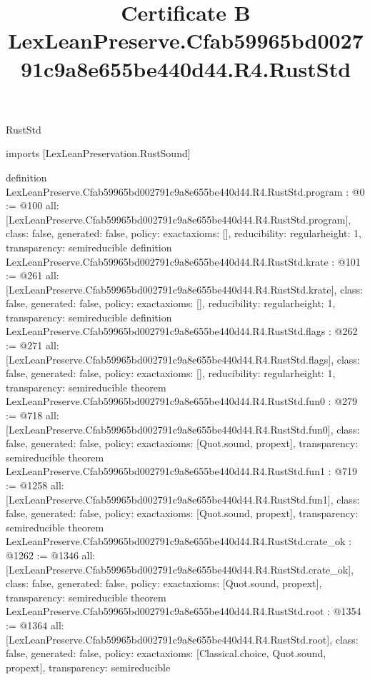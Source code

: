 \begin{lexlean}{RustStd}
\title{Certificate B LexLeanPreserve.Cfab59965bd002791c9a8e655be440d44.R4.RustStd}
\begin{coremodule}
imports [LexLeanPreservation.RustSound]

definition LexLeanPreserve.Cfab59965bd002791c9a8e655be440d44.R4.RustStd.program : @0 := @100 {
  all: [LexLeanPreserve.Cfab59965bd002791c9a8e655be440d44.R4.RustStd.program],
  class: false,
  generated: false,
  policy: exact{axioms: []},
  reducibility: regular{height: 1},
  transparency: semireducible
}
definition LexLeanPreserve.Cfab59965bd002791c9a8e655be440d44.R4.RustStd.krate : @101 := @261 {
  all: [LexLeanPreserve.Cfab59965bd002791c9a8e655be440d44.R4.RustStd.krate],
  class: false,
  generated: false,
  policy: exact{axioms: []},
  reducibility: regular{height: 1},
  transparency: semireducible
}
definition LexLeanPreserve.Cfab59965bd002791c9a8e655be440d44.R4.RustStd.flags : @262 := @271 {
  all: [LexLeanPreserve.Cfab59965bd002791c9a8e655be440d44.R4.RustStd.flags],
  class: false,
  generated: false,
  policy: exact{axioms: []},
  reducibility: regular{height: 1},
  transparency: semireducible
}
theorem LexLeanPreserve.Cfab59965bd002791c9a8e655be440d44.R4.RustStd.fun0 : @279 := @718 {
  all: [LexLeanPreserve.Cfab59965bd002791c9a8e655be440d44.R4.RustStd.fun0],
  class: false,
  generated: false,
  policy: exact{axioms: [Quot.sound, propext]},
  transparency: semireducible
}
theorem LexLeanPreserve.Cfab59965bd002791c9a8e655be440d44.R4.RustStd.fun1 : @719 := @1258 {
  all: [LexLeanPreserve.Cfab59965bd002791c9a8e655be440d44.R4.RustStd.fun1],
  class: false,
  generated: false,
  policy: exact{axioms: [Quot.sound, propext]},
  transparency: semireducible
}
theorem LexLeanPreserve.Cfab59965bd002791c9a8e655be440d44.R4.RustStd.crate_ok : @1262 := @1346 {
  all: [LexLeanPreserve.Cfab59965bd002791c9a8e655be440d44.R4.RustStd.crate_ok],
  class: false,
  generated: false,
  policy: exact{axioms: [Quot.sound, propext]},
  transparency: semireducible
}
theorem LexLeanPreserve.Cfab59965bd002791c9a8e655be440d44.R4.RustStd.root : @1354 := @1364 {
  all: [LexLeanPreserve.Cfab59965bd002791c9a8e655be440d44.R4.RustStd.root],
  class: false,
  generated: false,
  policy: exact{axioms: [Classical.choice, Quot.sound, propext]},
  transparency: semireducible
}


\end{coremodule}
\end{lexlean}
